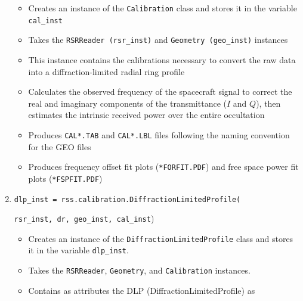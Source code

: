 \documentclass[titlepage, 12pt]{article}
\begin{document}
\begin{enumerate}
\begin{itemize}
                          \item Creates an instance of the
                                \texttt{Calibration} class and stores it in
                                the variable \texttt{cal\_inst} 
                          \item Takes the \texttt{RSRReader (rsr\_inst)}
                                and \texttt{Geometry (geo\_inst)} instances
                          \item This instance contains the calibrations
                                necessary to convert the raw data into a
                                diffraction-limited radial ring profile
                          \item Calculates the observed frequency of the
                                spacecraft signal to correct the real and
                                imaginary components of the transmittance
                                ($I$ and $Q$), then estimates the intrinsic
                                received power over the entire occultation
                          \item Produces \texttt{CAL*.TAB} and 
                                \texttt{CAL*.LBL} files following the
                                naming convention for the GEO files
                          \item Produces frequency offset fit
                                plots (\texttt{*FORFIT.PDF}) and free space
                                power fit plots (\texttt{*FSPFIT.PDF})
                      \end{itemize}
                \item \small{\texttt{dlp\_inst =
                                     rss.calibration.DiffractionLimitedProfile(}}
                      \par\hspace{4ex}
                      \small{\texttt{rsr\_inst, dr, geo\_inst, cal\_inst})}
                      \normalsize
                      \begin{itemize}
                          \item Creates an instance of the
                                \texttt{DiffractionLimitedProfile} class and
                                stores it in the variable \texttt{dlp\_inst}.
                          \item Takes the \texttt{RSRReader}, \texttt{Geometry},
                                and \texttt{Calibration} instances.
                          \item Contains as attributes the DLP (DiffractionLimitedProfile) as

\end{itemize}
\end{enumerate}
\end{document}
